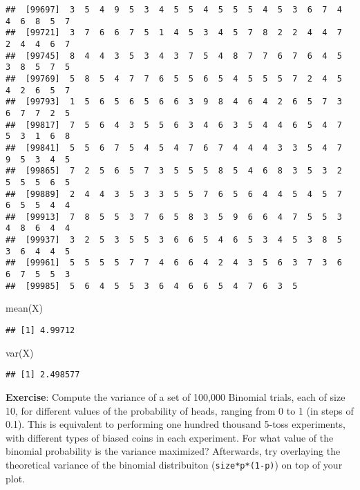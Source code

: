 \documentclass[
]{book}
\newenvironment{Shaded}{\begin{snugshade}}{\end{snugshade}}
\newcommand{\FunctionTok}[1]{\textcolor[rgb]{0.00,0.00,0.00}{#1}}
\newcommand{\NormalTok}[1]{#1}
\begin{document}
\begin{verbatim}
##  [99697]  3  5  4  9  5  3  4  5  5  4  5  5  5  4  5  3  6  7  4  4  6  8  5  7
##  [99721]  3  7  6  6  7  5  1  4  5  3  4  5  7  8  2  2  4  4  7  2  4  4  6  7
##  [99745]  8  4  4  3  5  3  4  3  7  5  4  8  7  7  6  7  6  4  5  3  8  5  7  5
##  [99769]  5  8  5  4  7  7  6  5  5  6  5  4  5  5  5  7  2  4  5  4  2  6  5  7
##  [99793]  1  5  6  5  6  5  6  6  3  9  8  4  6  4  2  6  5  7  3  6  7  7  2  5
##  [99817]  7  5  6  4  3  5  5  6  3  4  6  3  5  4  4  6  5  4  7  5  3  1  6  8
##  [99841]  5  5  6  7  5  4  5  4  7  6  7  4  4  4  3  3  5  4  7  9  5  3  4  5
##  [99865]  7  2  5  6  5  7  3  5  5  5  8  5  4  6  8  3  5  3  2  5  5  5  6  5
##  [99889]  2  4  4  3  5  3  3  5  5  7  6  5  6  4  4  5  4  5  7  6  5  5  4  4
##  [99913]  7  8  5  5  3  7  6  5  8  3  5  9  6  6  4  7  5  5  3  4  8  6  4  4
##  [99937]  3  2  5  3  5  5  3  6  6  5  4  6  5  3  4  5  3  8  5  3  6  4  4  5
##  [99961]  5  5  5  5  7  7  4  6  6  4  2  4  3  5  6  3  7  3  6  6  7  5  5  3
##  [99985]  5  6  4  5  5  3  6  4  6  6  5  4  7  6  3  5
\end{verbatim}

\begin{Shaded}
\begin{Highlighting}[]
\FunctionTok{mean}\NormalTok{(X)}
\end{Highlighting}
\end{Shaded}

\begin{verbatim}
## [1] 4.99712
\end{verbatim}

\begin{Shaded}
\begin{Highlighting}[]
\FunctionTok{var}\NormalTok{(X)}
\end{Highlighting}
\end{Shaded}

\begin{verbatim}
## [1] 2.498577
\end{verbatim}

\textbf{Exercise}: Compute the variance of a set of 100,000 Binomial trials, each of size 10, for different values of the probability of heads, ranging from 0 to 1 (in steps of 0.1). This is equivalent to performing one hundred thousand 5-toss experiments, with different types of biased coins in each experiment. For what value of the binomial probability is the variance maximized? Afterwards, try overlaying the theoretical variance of the binomial distribuiton (\texttt{size*p*(1-p)}) on top of your plot.
\end{document}
